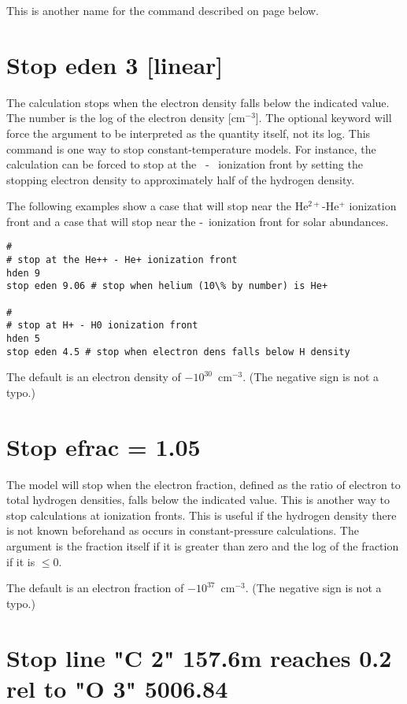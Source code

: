 This is another name for the  command
described on page \pageref{sec:CommandStopThckness} below.

\section{Stop eden 3 [linear]}

The calculation stops when the electron density falls below the
indicated value.
The number is the log of the electron density [cm$^{-3}$].
The optional
keyword  will force the argument to be interpreted as the quantity
itself, not its log.
This command is one way to stop constant-temperature
models.
For instance, the calculation can be forced to stop at the
\hplus\ - \hO\
ionization front by setting the stopping electron density to approximately
half of the hydrogen density.

The following examples show a case that will stop
near the
He$^{2+}$-He$^+$
ionization front and a case that will stop near
the \hplus-\hO\ ionization front
for solar abundances.
\begin{verbatim}
#
# stop at the He++ - He+ ionization front
hden 9
stop eden 9.06 # stop when helium (10\% by number) is He+

#
# stop at H+ - H0 ionization front
hden 5
stop eden 4.5 # stop when electron dens falls below H density
\end{verbatim}
The default is an electron density of $-10^{30}$~cm$^{-3}$.
(The negative sign
is not a typo.)

\section{Stop efrac = 1.05}

The model will stop when the electron fraction, defined as the ratio
of electron to total hydrogen densities, falls below the indicated value.
This is another way to stop calculations at ionization fronts.  This is
useful if the hydrogen density there is not known beforehand as occurs in
constant-pressure calculations.  The argument is the fraction itself if
it is greater than zero and the log of the fraction if it is $\le 0$.

The default is an electron fraction of $-10^{37}$~cm$^{-3}$.
(The negative sign is not a typo.)

\section{Stop line "C  2" 157.6m reaches 0.2 rel to  "O  3" 5006.84}


